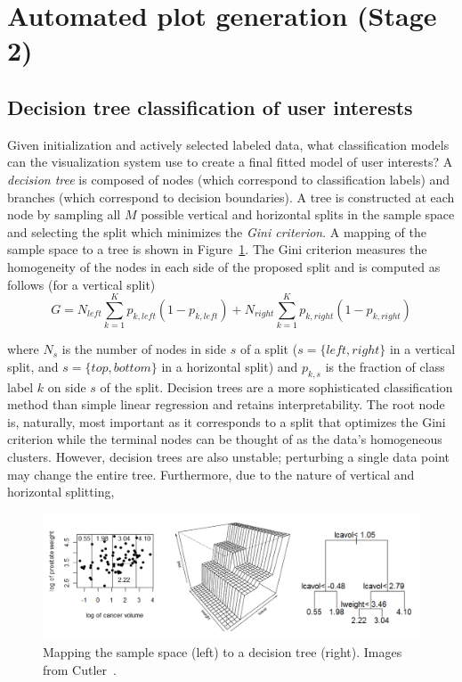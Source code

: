 \section{Automated plot generation (Stage 2)}
\label{sec:visualizer:plotgeneration}

\subsection{Decision tree classification of user interests}
\label{sec:visualizer:plotgeneration:tree}

Given initialization and actively selected labeled data, what classification 
models can the visualization system use to create a final fitted model of user 
interests? A \textit{decision tree} is composed of nodes (which correspond to 
classification labels) and branches (which correspond to decision boundaries). 
A tree is constructed at each node by sampling all $M$ possible vertical and 
horizontal splits in the sample space and selecting the split which minimizes 
the \textit{Gini criterion}. A mapping of the sample space to a tree is shown 
in Figure~\ref{fig:visualizer:plotgeneration:tree}. The Gini criterion measures 
the homogeneity of the nodes in each side of the proposed split and is computed 
as follows (for a vertical split)
$$G = N_{left} \sum\limits_{k=1}^{K} p_{k,left}(1-p_{k,left}) + N_{right} 
\sum\limits_{k=1}^{K}  p_{k,right}(1-p_{k,right})$$

\noindent where $N_s$ is the number of nodes in side $s$ of a split ($s = 
\{left,right\}$ in a vertical split, and $s = \{top,bottom\}$ in a horizontal 
split) and $p_{k,s}$ is the fraction of class label $k$ on side $s$ of the 
split. Decision trees are a more sophisticated classification method than 
simple linear regression and retains interpretability. The root node is, 
naturally, most important as it corresponds to a split that optimizes the Gini 
criterion while the terminal nodes can be thought of as the data's homogeneous 
clusters. However, decision trees are also unstable; perturbing a single 
data point may change the entire tree. Furthermore, due to the nature of 
vertical and horizontal splitting, 

\begin{figure}[htb]
	\begin{center}
		\includegraphics[width=1\linewidth]{ch-visualizer/figures/decisiontree}
		\caption[Mapping the sample space to a decision tree.]{Mapping the 
		sample space (left) to a decision tree (right). Images from 
		Cutler~\cite{cutler2010}.}
		\label{fig:visualizer:plotgeneration:tree}
	\end{center}
\end{figure}

